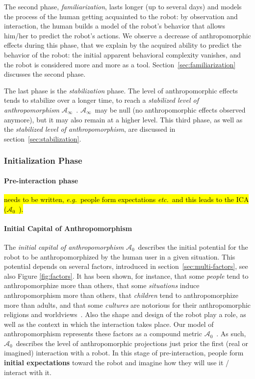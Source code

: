 \documentclass{frontiersSCNS} %
\newcommand{\eg}{{\textit{e.g.~}}}
\newcommand{\etc}{{\textit{etc.~}}}
\newcommand{\ICA}{{$\mathcal{A}_0$~}}
\newcommand{\SLA}{{$\mathcal{A}_\infty$~}}
\begin{document}
The second phase, \emph{familiarization}, lasts longer (up to several days) and
models the process of the human getting acquainted to the robot: by observation
and interaction, the human builds a model of the robot's behavior that allows
him/her to predict the robot's actions. We observe a decrease of
anthropomorphic effects during this phase, that we explain by the acquired
ability to predict the behavior of the robot: the initial apparent behavioral
complexity vanishes, and the robot is considered more and more as a tool.
Section~\ref{sec:familiarization} discusses the second phase.

The last phase is the \emph{stabilization} phase. The level of anthropomorphic
effects tends to stabilize over a longer time, to reach a \emph{stabilized
level of anthropomorphism} \SLA. \SLA may be null (no anthropomorphic
effects observed anymore), but it may also remain at a higher level.  This
third phase, as well as the \emph{stabilized level of anthropomorphism}, are
discussed in section~\ref{sec:stabilization}.


\subsubsection{Initialization Phase\\}
\label{sec:initialization}

\paragraph{Pre-interaction phase\\}
\hl{needs to be written, \eg people form expectations \etc and this leads to the ICA (\ICA).}

\paragraph{Initial Capital of Anthropomorphism\\}
\label{sec:ica}

The \emph{initial capital of anthropomorphism} \ICA describes the initial potential
for the robot to be anthropomorphized by the human user in a given situation.
This potential depends on several factors, introduced in
section~\ref{sec:multi-factors}, see also Figure \ref{fig:factors}. It has been shown, for instance, that
some \textit{people} tend to anthropomorphize more than others, that some
\textit{situations} induce anthropomorphism more than others, that
\textit{children} tend to anthropomorphize more than adults, and that some
\textit{cultures} are notorious for their anthropomorphic religions and
worldviews~\citep{epley_when_2008}. Also the shape and design of the robot play a
role, as well as the context in which the interaction takes place. Our model of
anthropomorphism represents these factors as a compound metric \ICA. As such,
\ICA describes the level of anthropomorphic projections just prior the first
(real or imagined) interaction with a robot. In this stage of pre-interaction, people
form \textbf{initial expectations} toward the robot and imagine how they will use it /
interact with it.
\end{document}
